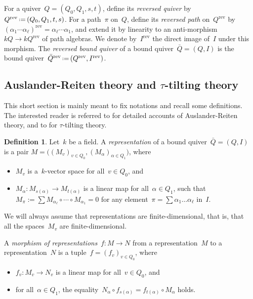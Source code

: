 \documentclass{amsart}
\theoremstyle{definition}
\newtheorem{definition}[theorem]{Definition}
\newcommand{\eqdef}{\mbox{\,\raisebox{0.2ex}{\scriptsize\ensuremath{\mathrm:}}\ensuremath{=}\,}} %
\newcommand{\darkblue}{\color{darkblue}} %
\newcommand{\defn}[1]{\textsl{\darkblue #1}} %
\newcommand{\reversed}[1]{#1^{\mathrm{rev}}} %
\begin{document}
For a quiver~$Q = (Q_0, Q_1, s, t)$, define its \defn{reversed quiver} by~$\reversed{Q} \eqdef (Q_0, Q_1, t, s)$.
For a path~$\pi$ on~$Q$, define its \defn{reversed path} on~$\reversed{Q}$ by~$\reversed{(\alpha_1 \cdots \alpha_\ell)} = \alpha_\ell \cdots \alpha_1$, and extend it by linearity to an anti-morphism~$kQ \to k\reversed{Q}$ of path algebras.
We denote by~$\reversed{I}$ the direct image of~$I$ under this morphism.
The \defn{reversed bound quiver} of a bound quiver~$\bar Q = (Q,I)$ is the bound quiver~$\reversed{\bar Q} \eqdef (\reversed{Q},\reversed{I})$.

\subsection{Auslander-Reiten theory and $\tau$-tilting theory}
\label{subsec:tautilting}

This short section is mainly meant to fix notations and recall some definitions.  The interested reader is referred to \cite{AssemSimsonSkowronski, Schiffler} for detailed accounts of Auslander-Reiten theory, and to \cite{AdachiIyamaReiten} for $\tau$-tilting theory.

\begin{definition}
Let~$k$ be a field.
A \defn{representation} of a bound quiver~$\bar Q = (Q,I)$ is a pair ${M = \big( (M_v)_{v\in Q_0}, (M_\alpha)_{\alpha\in Q_1} \big)}$, where
\begin{itemize}
\item $M_v$ is a~$k$-vector space for all~$v\in Q_0$, and
\item $M_\alpha: M_{s(\alpha)} \to M_{t(\alpha)}$ is a linear map for all~$\alpha \in Q_1$, such that $M_\pi := \sum M_{\alpha_{\ell}} \circ \cdots \circ M_{\alpha_1} = 0$  for any element~$\pi =\sum \alpha_1 \dots \alpha_\ell$ in~$I$.
\end{itemize}
%
We will always assume that representations are finite-dimensional, that is, that all the spaces~$M_v$ are finite-dimensional.

A \defn{morphism of representations}~$f:M\to N$ from a representation~$M$ to a representation~$N$ is a tuple~$f=(f_v)_{v\in Q_0}$, where
\begin{itemize}
\item $f_v:M_v\to N_v$ is a linear map for all~$v\in Q_0$, and
\item for all~$\alpha\in Q_1$, the equality~$N_\alpha \circ f_{s(\alpha)} = f_{t(\alpha)} \circ M_\alpha$ holds.
\end{itemize}
\end{definition}
\end{document}
